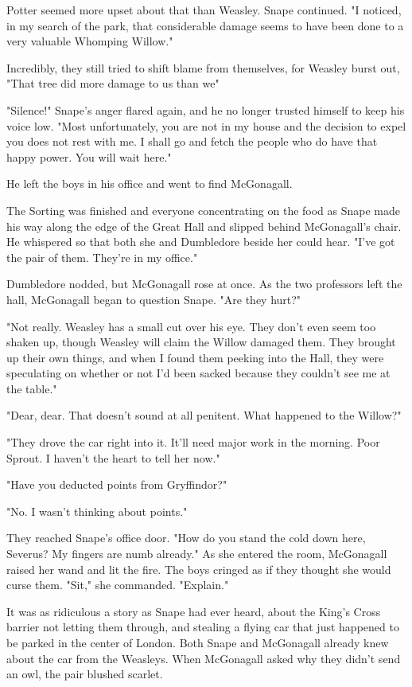 Potter seemed more upset about that than Weasley. Snape continued. "I noticed, in my search of the park, that considerable damage seems to have been done to a very valuable Whomping Willow."

Incredibly, they still tried to shift blame from themselves, for Weasley burst out, "That tree did more damage to us than we{\el}"

"Silence!" Snape's anger flared again, and he no longer trusted himself to keep his voice low. "Most unfortunately, you are not in my house and the decision to expel you does not rest with me. I shall go and fetch the people who do have that happy power. You will wait here."

He left the boys in his office and went to find McGonagall.

The Sorting was finished and everyone concentrating on the food as Snape made his way along the edge of the Great Hall and slipped behind McGonagall's chair. He whispered so that both she and Dumbledore beside her could hear. "I've got the pair of them. They're in my office."

Dumbledore nodded, but McGonagall rose at once. As the two professors left the hall, McGonagall began to question Snape. "Are they hurt?"

"Not really. Weasley has a small cut over his eye. They don't even seem too shaken up, though Weasley will claim the Willow damaged them. They brought up their own things, and when I found them peeking into the Hall, they were speculating on whether or not I'd been sacked because they couldn't see me at the table."

"Dear, dear. That doesn't sound at all penitent. What happened to the Willow?"

"They drove the car right into it. It'll need major work in the morning. Poor Sprout. I haven't the heart to tell her now."

"Have you deducted points from Gryffindor?"

"No. I wasn't thinking about points."

They reached Snape's office door. "How do you stand the cold down here, Severus? My fingers are numb already." As she entered the room, McGonagall raised her wand and lit the fire. The boys cringed as if they thought she would curse them. "Sit," she commanded. "Explain."

It was as ridiculous a story as Snape had ever heard, about the King's Cross barrier not letting them through, and stealing a flying car that just happened to be parked in the center of London. Both Snape and McGonagall already knew about the car from the Weasleys. When McGonagall asked why they didn't send an owl, the pair blushed scarlet.

